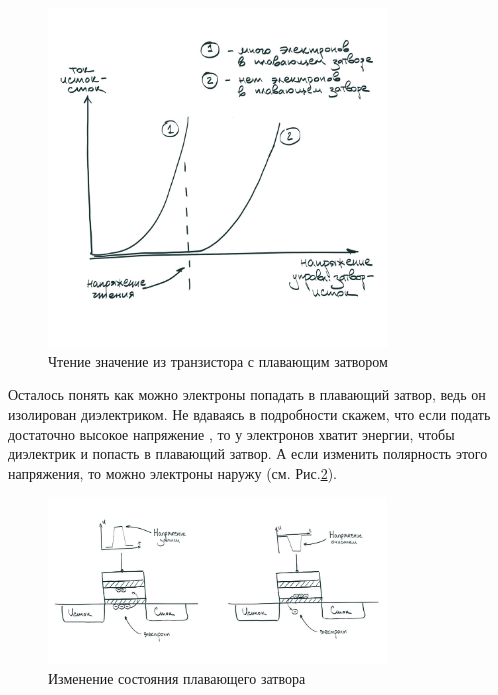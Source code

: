 \begin{figure}[H]
\centering
% 
\includegraphics[width=0.8\textwidth]{./images/lab_6/floating_gate_read}
\caption{Чтение значение из транзистора с плавающим затвором}
\label{fig:floating_gate_read}
\end{figure}

\par{Осталось понять как можно  электроны попадать в плавающий затвор, ведь он изолирован диэлектриком. Не вдаваясь в подробности скажем, что если подать достаточно высокое напряжение , то у электронов хватит энергии, чтобы  диэлектрик и попасть в плавающий затвор. А если изменить полярность этого напряжения, то можно  электроны наружу (см. Рис.\ref{fig:floating_gate_change}).}

\begin{figure}[H]
\centering
% 
\includegraphics[width=0.8\textwidth]{./images/lab_6/floating_gate_change}
\caption{Изменение состояния плавающего затвора}
\label{fig:floating_gate_change}
\end{figure}

